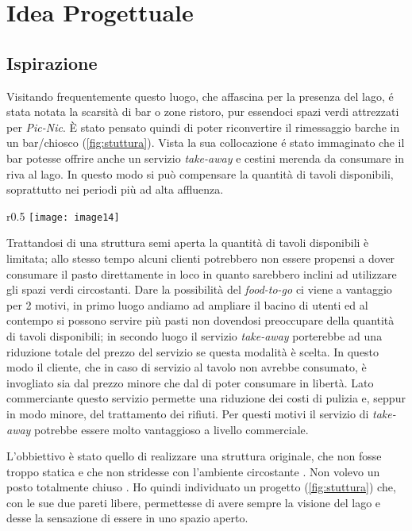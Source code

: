\section{Idea Progettuale}

\subsection{Ispirazione}

Visitando frequentemente questo luogo, che affascina per la presenza del lago, é stata notata la scarsità di bar o zone ristoro, pur essendoci spazi verdi attrezzati per \textit{Pic-Nic}. È stato pensato quindi di poter riconvertire il rimessaggio barche in un bar/chiosco (\cref{fig:stuttura}). Vista la sua collocazione é stato immaginato che il bar potesse offrire anche un servizio \textit{take-away} e cestini merenda da consumare in riva al lago. In questo modo si può compensare la quantità di tavoli disponibili, soprattutto nei periodi più ad alta affluenza. 

\begin{wrapfigure}[18]{r}{0.5\textwidth}
	\centering
	\texttt{[image: image14]}
	\caption{Struttura}
	\label{fig:stuttura}
\end{wrapfigure}

Trattandosi di una struttura semi aperta la quantità di tavoli disponibili è limitata; allo stesso tempo alcuni clienti potrebbero non essere propensi a dover consumare il pasto direttamente in loco in quanto sarebbero inclini ad utilizzare gli spazi verdi circostanti. Dare la possibilità del \textit{food-to-go} ci viene a vantaggio per 2 motivi, in primo luogo andiamo ad ampliare il bacino di utenti ed al contempo si possono servire più pasti non dovendosi preoccupare della quantità di tavoli disponibili; in secondo luogo il servizio \textit{take-away} porterebbe ad una riduzione totale del prezzo del servizio se questa modalità è scelta. In questo modo il cliente, che in caso di servizio al tavolo non avrebbe consumato, è invogliato sia dal prezzo minore che dal  di poter consumare in libertà. Lato commerciante questo servizio permette una riduzione dei costi di pulizia e, seppur in modo minore, del trattamento dei rifiuti.  Per questi motivi il servizio di \textit{take-away} potrebbe essere molto vantaggioso a livello commerciale.

L'obbiettivo è stato quello di realizzare una struttura  originale, che non fosse troppo statica e che non  stridesse con l’ambiente circostante . Non volevo un posto totalmente chiuso . Ho quindi individuato un progetto (\cref{fig:stuttura}) che,  con  le sue due  pareti libere,  permettesse di avere sempre la visione del lago e desse la sensazione di essere in uno spazio aperto. 

